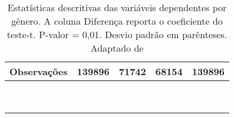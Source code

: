 \begin{table}[h!]
\begin{tabular}{lcccc}
    Observações                                       & 139896                                                   & 71742                                                    & 68154                                                    & 139896               \\ \hline
                                                      & \multicolumn{1}{l}{}                                     & \multicolumn{1}{l}{}                                     & \multicolumn{1}{l}{}                                     & \multicolumn{1}{l}{} \\
                                                      & \multicolumn{1}{l}{}                                     & \multicolumn{1}{l}{}                                     & \multicolumn{1}{l}{}                                     & \multicolumn{1}{l}{} \\
                                                      & \multicolumn{1}{l}{}                                     & \multicolumn{1}{l}{}                                     & \multicolumn{1}{l}{}                                     & \multicolumn{1}{l}{} \\
                                                      & \multicolumn{1}{l}{}                                     & \multicolumn{1}{l}{}                                     & \multicolumn{1}{l}{}                                     & \multicolumn{1}{l}{} \\
                                                      & \multicolumn{1}{l}{}                                     & \multicolumn{1}{l}{}                                     & \multicolumn{1}{l}{}                                     & \multicolumn{1}{l}{} \\
                                                      & \multicolumn{1}{l}{}                                     & \multicolumn{1}{l}{}                                     & \multicolumn{1}{l}{}                                     & \multicolumn{1}{l}{} \\
                                                      & \multicolumn{1}{l}{}                                     & \multicolumn{1}{l}{}                                     & \multicolumn{1}{l}{}                                     & \multicolumn{1}{l}{} \\
                                                      & \multicolumn{1}{l}{}                                     & \multicolumn{1}{l}{}                                     & \multicolumn{1}{l}{}                                     & \multicolumn{1}{l}{} \\
                                                      & \multicolumn{1}{l}{}                                     & \multicolumn{1}{l}{}                                     & \multicolumn{1}{l}{}                                     & \multicolumn{1}{l}{}
    \end{tabular}
    \caption{Estatísticas descritivas das variáveis dependentes por gênero. A coluna Diferença reporta o coeficiente do teste-t. P-valor = 0,01. Desvio padrão em parênteses. Adaptado de \citet{Borges2021}}
    \label{tab:resultados-borges}
    \end{table}

